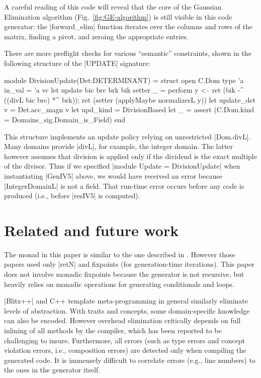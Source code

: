 \documentclass{elsart}
\begin{document}
A careful reading of this code will reveal that the core of the 
Gaussian Elimination algorithm (Fig.~\ref{fig:GE-algorithm}) 
is still visible in this code generator:
the |forward_elim| function iterates over the columns and rows of the
matrix, finding a pivot, and zeroing the appropriate entries.

There are more preflight checks for various ``semantic'' constraints, shown
in the following structure of the |UPDATE| signature:
\begin{code}
module DivisionUpdate(Det:DETERMINANT) = struct
  open C.Dom
  type 'a in_val = 'a vc
  let update bic brc brk bik setter _ = perform
      y <-- ret (bik -^ ((divL bic brc) *^ brk));
      ret (setter (applyMaybe normalizerL y))
  let update_det v = Det.acc_magn v
  let upd_kind = DivisionBased
  let _ = assert (C.Dom.kind = Domains_sig.Domain_is_Field)
end
\end{code}
%
This structure implements an update policy relying on
unrestricted |Dom.divL|. Many domains provide |divL|, for example,
the integer domain. The latter however assumes that division is applied
only if the dividend is the exact multiple of the divisor. Thus if we
specified |module Update = DivisionUpdate| when instantiating |GenIV5|
above, we would have received an error because |IntegerDomainL| is not
a field. That run-time error occurs before any code is produced (i.e.,
before |resIV5| is computed).

\section{Related and future work}\label{related}

The monad in this paper is similar to the one described in
\cite{SwadiMonadic06,KiselyovTaha}.  However those papers used only
|retN| and fixpoints (for generation-time iterations).  This paper
does not involve monadic fixpoints because the generator is not
recursive, but heavily relies on monadic operations for generating
conditionals and loops.

|Blitz++| \cite{Veldhuizen:1998:ISCOPE} and {C++} template
meta-programming in general similarly eliminate levels
of abstraction.  With traits and concepts, some domain-specific
knowledge can also be encoded.  However overhead elimination
critically depends on full inlining of all methods by the compiler,
which has been reported to be challenging to insure. Furthermore, all
errors (such as type errors and concept violation errors, i.e.,
composition errors) are detected only when compiling the generated
code. It is immensely difficult to correlate errors (e.g., line
numbers) to the ones in the generator itself.
\end{document}
